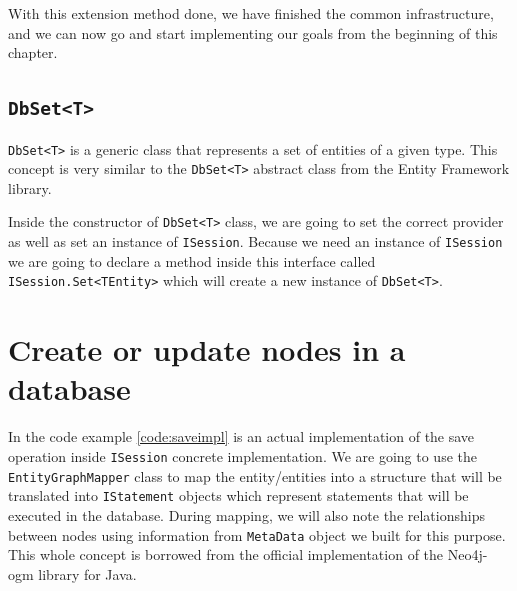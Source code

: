 With this extension method done, we have finished the common infrastructure, and we can now go and start implementing our
goals from the beginning of this chapter.

\subsection{\texttt{DbSet<T>}}

\texttt{DbSet<T>} is a generic class that represents a set of entities of a given type. This concept is very similar to the \texttt{DbSet<T>} abstract class from the Entity Framework library.

Inside the constructor of \texttt{DbSet<T>} class, we are going to set the correct provider as well as set an instance of \texttt{ISession}.
Because we need an instance of \texttt{ISession} we are going to declare a method inside this interface called
\texttt{ISession.Set<TEntity>} which will create a new instance
of \texttt{DbSet<T>}.

\section{Create or update nodes in a database}

In the code example \ref{code:saveimpl} is an actual implementation of the save operation inside \texttt{ISession} concrete implementation.
We are going to use the \texttt{EntityGraphMapper} class to map the entity/entities into a structure that will be translated into
\texttt{IStatement} objects which represent statements that will be executed in the database. During mapping, we will also note the relationships between nodes
using information from \texttt{MetaData} object we built for this purpose. This whole concept is borrowed from
the official implementation of the Neo4j-\acrshort{ogm} library for Java.



